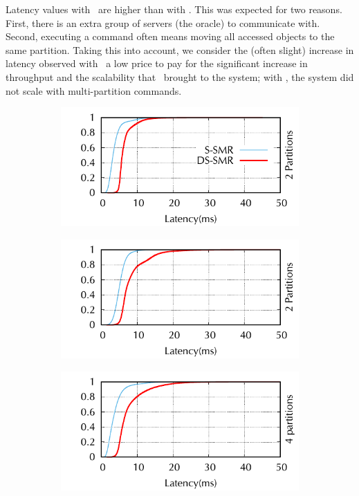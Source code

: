 Latency values with \dssmr\ are higher than with \ssmr{}. This was expected for
two reasons. First, there is an extra group of servers (the oracle) to
communicate with. Second, executing a command often means moving all accessed
objects to the same partition. Taking this into account, we consider the (often
slight) increase in latency observed with \dssmr\ a low price to pay for the
significant increase in throughput and the scalability that \dssmr\ brought to
the system; with \ssmr{}, the system did not scale with multi-partition
commands.


\begin{figure}[ht!]
\centering
\begin{subfigure}{.48\textwidth}
      \centering
      \includegraphics[width=\textwidth]{./figures/experiments/dssmr/latency-cdf-mix-2p}
\end{subfigure}
\begin{subfigure}{.48\textwidth}
      \centering
      \includegraphics[width=\textwidth]{./figures/experiments/dssmr/latency-cdf-post-2p}
\end{subfigure}
\begin{subfigure}{.48\textwidth}
      \centering
      \includegraphics[width=\textwidth]{./figures/experiments/dssmr/latency-cdf-mix-4p}

\end{subfigure}
\end{figure}
